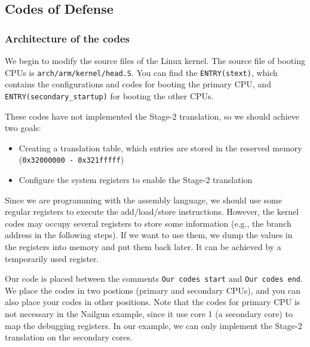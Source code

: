 \subsection{Codes of Defense}

\subsubsection{Architecture of the codes}

We begin to modify the source files of the Linux kernel. The source file of booting CPUs is \texttt{arch/arm/kernel/head.S}. You can find the \texttt{ENTRY(stext)}, which contains the configurations and codes for booting the primary CPU, and \texttt{ENTRY(secondary\_startup)} for booting the other CPUs. 

These codes have not implemented the Stage-2 translation, so we should achieve two goals: 
\begin{itemize}
	\item Creating a translation table, which entries are stored in the reserved memory (\texttt{0x32000000 - 0x321fffff})
	\item Configure the system registers to enable the Stage-2 translation
\end{itemize}

Since we are programming with the assembly language, we should use some regular registers to execute the add/load/store instructions. However, the kernel codes may occupy several registers to store some information (e.g., the branch address in the following steps). If we want to use them, we dump the values in the registers into memory and put them back later. It can be achieved by a temporarily used register.



Our code is placed between the comments \texttt{Our codes start} and \texttt{Our codes end}. We place the codes in two postions (primary and secondary CPUs), and you can also place your codes in other positions.
Note that the codes for primary CPU is not necessary in the Nailgun example, since it use core 1 (a secondary core) to map the debugging registers. In our example, we can only implement the Stage-2 translation on the secondary cores.

